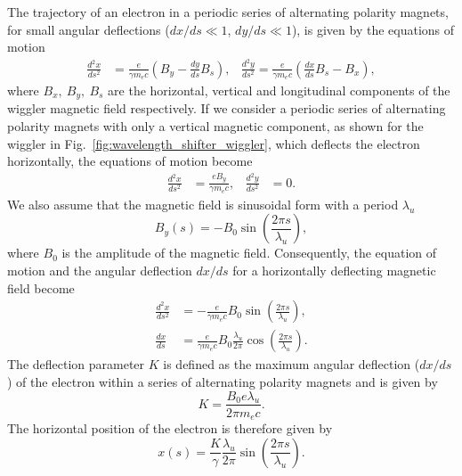 \documentclass[../main.tex]{subfiles}
\begin{document}
The trajectory of an electron in a periodic series of alternating polarity magnets, for small angular deflections ($dx/ds \ll 1$, $dy/ds \ll 1$), is given by the equations of motion
\begin{align}
\frac{d^{2}x}{ds^{2}} &= \frac{e}{\gamma m_{e}c}\left(B_{y}-\frac{dy}{ds}B_{s}\right), & \frac{d^{2}y}{ds^{2}} = \frac{e}{\gamma m_{e}c}\left(\frac{dx}{ds}B_{s}-B_{x}\right), 
\label{eq:undulator_equations_of_motion}    
\end{align}
where $B_{x},~B_{y},~B_{s}$ are the horizontal, vertical and longitudinal components of the wiggler magnetic field respectively. If we consider a periodic series of alternating polarity magnets with only a vertical magnetic component, as shown for the wiggler in Fig.~\ref{fig:wavelength_shifter_wiggler}, which deflects the electron horizontally, the equations of motion become
\begin{align}
\frac{d^{2}x}{ds^{2}} &= \frac{eB_{y}}{\gamma m_{e}c}, & \frac{d^{2}y}{ds^{2}} &= 0.
\label{eq:planar_undulator_equations_of_motion}    
\end{align}
We also assume that the magnetic field is sinusoidal form with a period $\lambda_{u}$
\begin{equation}
B_{y}\left(s\right) = -B_{0}\sin\left(\frac{2\pi s}{\lambda_{u}}\right),
\label{eq:wiggler_magnetic_field}    
\end{equation}
where $B_{0}$ is the amplitude of the magnetic field. Consequently, the equation of motion and the angular deflection $dx/ds$ for a horizontally deflecting magnetic field become
\begin{align}
\frac{d^{2}x}{ds^{2}} &= -\frac{e}{\gamma m_{e}c}B_{0}\sin\left(\frac{2\pi s}{\lambda_{u}}\right), \\
\frac{dx}{ds} &= \frac{e}{\gamma m_{e}c}B_{0}\frac{\lambda_{u}}{2\pi}\cos\left(\frac{2\pi s}{\lambda_{u}}\right).
\label{eq:undulator_eq_of_motion_deflection}
\end{align}
The deflection parameter $K$ is defined as the maximum angular deflection ($dx/ds$) of the electron within a series of alternating polarity magnets and is given by
\begin{equation}
K = \frac{B_{0}e\lambda_{u}}{2\pi m_{e}c}.
\label{eq:deflection_parameter}    
\end{equation}
The horizontal position of the electron is therefore given by 
\begin{equation}
x\left(s\right) = \frac{K}{\gamma}\frac{\lambda_{u}}{2\pi}\sin\left(\frac{2\pi s}{\lambda_{u}}\right).
\label{eq:x_electron_undulator}    
\end{equation}
\end{document}
